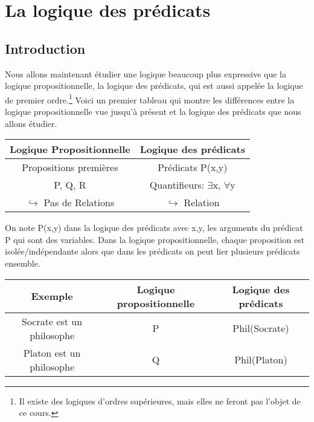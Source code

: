 \chapter{La logique des prédicats}
 
\section{Introduction}

Nous allons maintenant étudier une logique beaucoup plus expressive que la
logique propositionnelle, la logique des prédicats, qui est aussi appelée
la logique de premier ordre.\footnote{Il existe des logiques d'ordres supérieures,
mais elles ne feront pas l'objet de ce cours.}
Voici un premier tableau qui montre les différences entre la logique propositionnelle vue jusqu'à présent et la logique des prédicats que nous allons étudier.
\begin{center}
\begin{tabular}{|c|c|}
\hline 
Logique Propositionnelle & Logique des prédicats \\ 
\hline
Propositions premières & Prédicats P(x,y) \\ 
P, Q, R & Quantifieurs: $\exists$x, $\forall$y \\ 
$\hookrightarrow$ Pas de Relations & $\hookrightarrow$ Relation \\ 
\hline 
\end{tabular} 
\end{center}

On note P(x,y) dans la logique des prédicats avec x,y, les arguments du prédicat P qui sont des variables.
Dans la logique propositionnelle, chaque proposition est isolée/indépendante alors que dans les prédicats on peut lier plusieurs prédicats ensemble.


\begin{center}
\begin{tabular}{|c|c|c|}
\hline 
Exemple & Logique propositionnelle & Logique des prédicats \\ 
\hline 
Socrate est un philosophe & P & Phil(Socrate) \\ 
Platon est un philosophe & Q & Phil(Platon) \\ 
\hline 
\end{tabular} 
\end{center}

